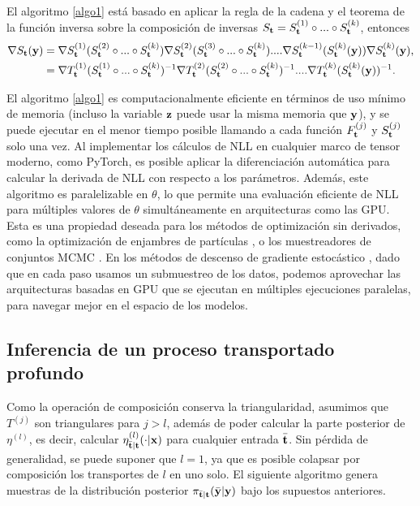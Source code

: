 \begin{remark}
	El algoritmo \ref{algo1} está basado en aplicar la regla de la cadena y el teorema de la función inversa sobre la composición de inversas \(S_{\mathbf{t}} = S_{\mathbf{t}}^{(1)} \circ ... \circ S_{\mathbf{t}}^{(k)}\), entonces
	\begin{align}
	\nabla S_{\mathbf{t}}(\mathbf{y}) &= \nabla S_{\mathbf{t}}^{(1)}( S_{\mathbf{t}}^{(2)} \circ ... \circ S_{\mathbf{t}}^{(k)}) \nabla S_{\mathbf{t}}^{(2)}( S_{\mathbf{t}}^{(3)} \circ ... \circ S_{\mathbf{t}}^{(k)}) .... \nabla S_{\mathbf{t}}^{(k-1)}(S_{\mathbf{t}}^{(k)}(\mathbf{y}))  \nabla S_{\mathbf{t}}^{(k)}(\mathbf{y}),\\
	&= \nabla T_{\mathbf{t}}^{(1)}( S_{\mathbf{t}}^{(1)} \circ ... \circ S_{\mathbf{t}}^{(k)})^{-1} \nabla T_{\mathbf{t}}^{(2)}( S_{\mathbf{t}}^{(2)} \circ ... \circ S_{\mathbf{t}}^{(k)})^{-1} .... \nabla T_{\mathbf{t}}^{(k)}(S_{\mathbf{t}}^{(k)}(\mathbf{y}))^{-1}.
	\end{align}
\end{remark}

El algoritmo \ref{algo1} es computacionalmente eficiente en términos de uso mínimo de memoria (incluso la variable \(\mathbf{z}\) puede usar la misma memoria que \(\mathbf{y}\)), y se puede ejecutar en el menor tiempo posible llamando a cada función \(F_{\mathbf{t}}^{(j)}\) y \(S_{\mathbf{t}}^{(j)}\) solo una vez. Al implementar los cálculos de NLL en cualquier marco de tensor moderno, como PyTorch, es posible aplicar la diferenciación automática \cite{paszke2017automatic} para calcular la derivada de NLL con respecto a los parámetros. Además, este algoritmo es paralelizable en \(\theta\), lo que permite una evaluación eficiente de NLL para múltiples valores de \(\theta\) simultáneamente en arquitecturas como las GPU. Esta es una propiedad deseada para los métodos de optimización sin derivados, como la optimización de enjambres de partículas \cite{kennedy2010particle}, o los muestreadores de conjuntos MCMC \cite{goodman2010ensemble}. En los métodos de descenso de gradiente estocástico \cite{bottou2010large}, dado que en cada paso usamos un submuestreo de los datos, podemos aprovechar las arquitecturas basadas en GPU que se ejecutan en múltiples ejecuciones paralelas, para navegar mejor en el espacio de los modelos.


\subsection{Inferencia de un proceso transportado profundo}

Como la operación de composición conserva la triangularidad, asumimos que \(T^{(j)}\) son triangulares para \(j > l\), además de poder calcular la parte posterior de \(\eta^{(l)}\), es decir, calcular \(\eta_{\bar{\mathbf{t}}|\mathbf{t}}^{(l)}(\cdot|\mathbf{x})\) para cualquier entrada \(\bar{\mathbf{t}}\). Sin pérdida de generalidad, se puede suponer que \(l = 1\), ya que es posible colapsar por composición los transportes de \(l\) en uno solo. El siguiente algoritmo genera muestras de la distribución posterior \(\pi_{\bar{\mathbf{t}}|\mathbf{t}}(\bar{\mathbf{y}}|\mathbf{y})\) bajo los supuestos anteriores.

